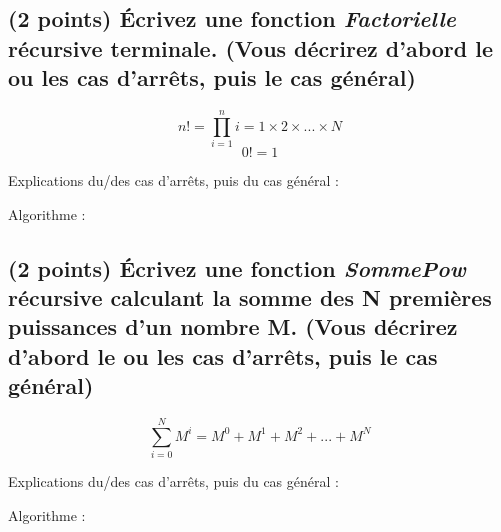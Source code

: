 \documentclass[11pt,a4paper]{article}
\begin{document}
\subsection{(2 points) \'Ecrivez une fonction \og \textit{Factorielle} \fg{} récursive terminale. (Vous décrirez d'abord le ou les cas d'arrêts, puis le cas général) }

\vspace*{-0.5cm}

\begin{center}

\begin{equation*}
n! = \prod^{n}_{i = 1} i = 1 \times 2 \times ... \times N
\end{equation*}
%
\vspace*{-0.5cm}
%
\begin{equation*}
0! = 1
\end{equation*}

Explications du/des cas d'arrêts, puis du cas général :

\bigskip

Algorithme :
\end{center}


\clearpage


\subsection{(2 points) \'Ecrivez une fonction \og \textit{SommePow} \fg{} récursive calculant la somme des N premières puissances d'un nombre M. (Vous décrirez d'abord le ou les cas d'arrêts, puis le cas général) }

\vspace*{-0.5cm}

\begin{center}

\begin{equation*}
\sum^{N}_{i = 0} M^{i} = M^{0} + M^{1} + M^{2} + ... + M^{N}
\end{equation*}

Explications du/des cas d'arrêts, puis du cas général :

\bigskip

Algorithme :
\end{center}

\smallskip




%
%
%
%
\end{document}
